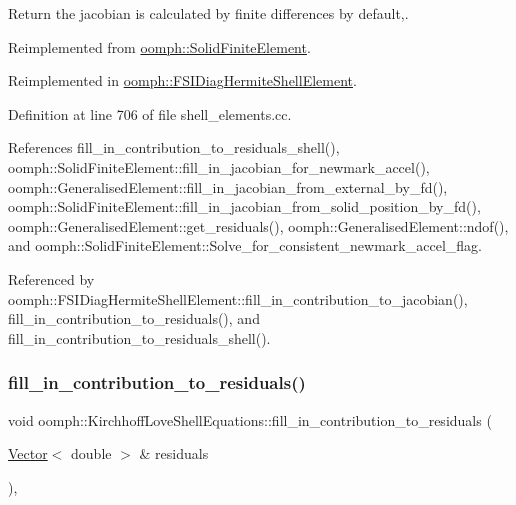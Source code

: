 Return the jacobian is calculated by finite differences by default,. 



Reimplemented from \hyperlink{classoomph_1_1SolidFiniteElement_a3167a2005e33815948bef357214e15ee}{oomph\+::\+Solid\+Finite\+Element}.



Reimplemented in \hyperlink{classoomph_1_1FSIDiagHermiteShellElement_a5e48d1c0291cf16cacaa8b42112efe90}{oomph\+::\+F\+S\+I\+Diag\+Hermite\+Shell\+Element}.



Definition at line 706 of file shell\+\_\+elements.\+cc.



References fill\+\_\+in\+\_\+contribution\+\_\+to\+\_\+residuals\+\_\+shell(), oomph\+::\+Solid\+Finite\+Element\+::fill\+\_\+in\+\_\+jacobian\+\_\+for\+\_\+newmark\+\_\+accel(), oomph\+::\+Generalised\+Element\+::fill\+\_\+in\+\_\+jacobian\+\_\+from\+\_\+external\+\_\+by\+\_\+fd(), oomph\+::\+Solid\+Finite\+Element\+::fill\+\_\+in\+\_\+jacobian\+\_\+from\+\_\+solid\+\_\+position\+\_\+by\+\_\+fd(), oomph\+::\+Generalised\+Element\+::get\+\_\+residuals(), oomph\+::\+Generalised\+Element\+::ndof(), and oomph\+::\+Solid\+Finite\+Element\+::\+Solve\+\_\+for\+\_\+consistent\+\_\+newmark\+\_\+accel\+\_\+flag.



Referenced by oomph\+::\+F\+S\+I\+Diag\+Hermite\+Shell\+Element\+::fill\+\_\+in\+\_\+contribution\+\_\+to\+\_\+jacobian(), fill\+\_\+in\+\_\+contribution\+\_\+to\+\_\+residuals(), and fill\+\_\+in\+\_\+contribution\+\_\+to\+\_\+residuals\+\_\+shell().

\mbox{\label{classoomph_1_1KirchhoffLoveShellEquations_a98020c975dd08c1faf3ecbe8f127788d}} 
\subsubsection{\texorpdfstring{fill\+\_\+in\+\_\+contribution\+\_\+to\+\_\+residuals()}{fill\_in\_contribution\_to\_residuals()}}
{\footnotesize\ttfamily void oomph\+::\+Kirchhoff\+Love\+Shell\+Equations\+::fill\+\_\+in\+\_\+contribution\+\_\+to\+\_\+residuals (\begin{DoxyParamCaption}\item[{\hyperlink{classoomph_1_1Vector}{Vector}$<$ double $>$ \&}]{residuals }\end{DoxyParamCaption})\hspace{0.3cm}{\ttfamily [inline]}, {\ttfamily [virtual]}}



